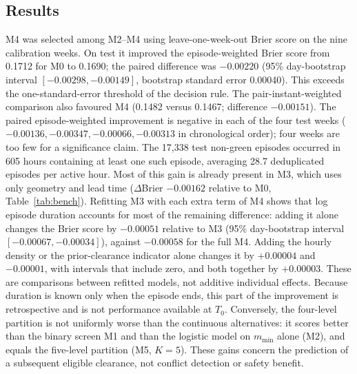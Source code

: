 \documentclass[aerospace,article,submit,moreauthors]{Definitions/mdpi}
\newcommand{\mmin}{m_{\min}}
\begin{document}
\subsection{Results}
M4 was selected among M2--M4 using leave-one-week-out Brier score on the nine calibration weeks. On test it improved the episode-weighted Brier score from 0.1712 for M0 to 0.1690; the paired difference was $-0.00220$ (95\% day-bootstrap interval $[-0.00298,-0.00149]$, bootstrap standard error 0.00040). This exceeds the one-standard-error threshold of the decision rule. The pair-instant-weighted comparison also favoured M4 (0.1482 versus 0.1467; difference $-0.00151$). The paired episode-weighted improvement is negative in each of the four test weeks ($-0.00136,-0.00347,-0.00066,-0.00313$ in chronological order); four weeks are too few for a significance claim. The 17,338 test non-green episodes occurred in 605 hours containing at least one such episode, averaging 28.7 deduplicated episodes per active hour. Most of this gain is already present in M3, which uses only geometry and lead time ($\Delta$Brier $-0.00162$ relative to M0, Table~\ref{tab:bench}). Refitting M3 with each extra term of M4 shows that log episode duration accounts for most of the remaining difference: adding it alone changes the Brier score by $-0.00051$ relative to M3 (95\% day-bootstrap interval $[-0.00067,-0.00034]$), against $-0.00058$ for the full M4. Adding the hourly density or the prior-clearance indicator alone changes it by $+0.00004$ and $-0.00001$, with intervals that include zero, and both together by $+0.00003$. These are comparisons between refitted models, not additive individual effects. Because duration is known only when the episode ends, this part of the improvement is retrospective and is not performance available at $T_0$. Conversely, the four-level partition is not uniformly worse than the continuous alternatives: it scores better than the binary screen M1 and than the logistic model on $\mmin$ alone (M2), and equals the five-level partition (M5, $K=5$). These gains concern the prediction of a subsequent eligible clearance, not conflict detection or safety benefit.
\end{document}
